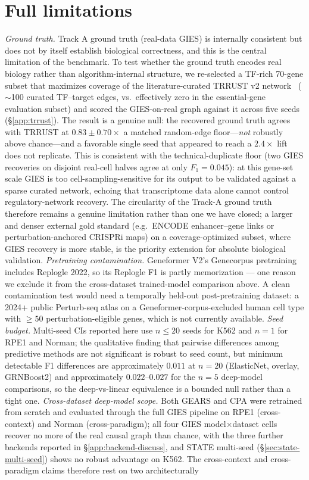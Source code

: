 \documentclass{article}
\theoremstyle{plain}
\theoremstyle{definition}
\theoremstyle{remark}
\begin{document}
\section{Full limitations}
\label{sec:limitations}
\textit{Ground truth.} Track A ground truth (real-data GIES) is internally consistent but does not by itself establish biological correctness, and this is the central limitation of the benchmark. To test whether the ground truth encodes real biology rather than algorithm-internal structure, we re-selected a TF-rich 70-gene subset that maximizes coverage of the literature-curated TRRUST v2 network~\citep{han2018trrust} ($\sim$100 curated TF--target edges, vs.\ effectively zero in the essential-gene evaluation subset) and scored the GIES-on-real graph against it across five seeds (\S\ref{app:trrust}). The result is a genuine null: the recovered ground truth agrees with TRRUST at $0.83 \pm 0.70\times$ a matched random-edge floor---\emph{not} robustly above chance---and a favorable single seed that appeared to reach a $2.4\times$ lift does not replicate. This is consistent with the technical-duplicate floor (two GIES recoveries on disjoint real-cell halves agree at only $F_1 = 0.045$): at this gene-set scale GIES is too cell-sampling-sensitive for its output to be validated against a sparse curated network, echoing \citet{kernfeld2024fdr} that transcriptome data alone cannot control regulatory-network recovery. The circularity of the Track-A ground truth therefore remains a genuine limitation rather than one we have closed; a larger and denser external gold standard (e.g.\ ENCODE enhancer--gene links or perturbation-anchored CRISPRi maps) on a coverage-optimized subset, where GIES recovery is more stable, is the priority extension for absolute biological validation. \textit{Pretraining contamination.} Geneformer V2's Genecorpus pretraining includes Replogle 2022, so its Replogle F1 is partly memorization --- one reason we exclude it from the cross-dataset trained-model comparison above. A clean contamination test would need a temporally held-out post-pretraining dataset: a 2024+ public Perturb-seq atlas on a Geneformer-corpus-excluded human cell type with $\geq 50$ perturbation-eligible genes, which is not currently available. \textit{Seed budget.} Multi-seed CIs reported here use $n \leq 20$ seeds for K562 and $n=1$ for RPE1 and Norman; the qualitative finding that pairwise differences among predictive methods are not significant is robust to seed count, but minimum detectable F1 differences are approximately $0.011$ at $n=20$ (ElasticNet, overlay, GRNBoost2) and approximately $0.022$--$0.027$ for the $n=5$ deep-model comparisons, so the deep-vs-linear equivalence is a bounded null rather than a tight one. \textit{Cross-dataset deep-model scope.} Both GEARS and CPA were retrained from scratch and evaluated through the full GIES pipeline on RPE1 (cross-context) and Norman (cross-paradigm); all four GIES model$\times$dataset cells recover no more of the real causal graph than chance, with the three further backends reported in \S\ref{app:backend-discuss}, and STATE multi-seed (\S\ref{sec:state-multi-seed}) shows no robust advantage on K562. The cross-context and cross-paradigm claims therefore rest on two architecturally 
\end{document}
